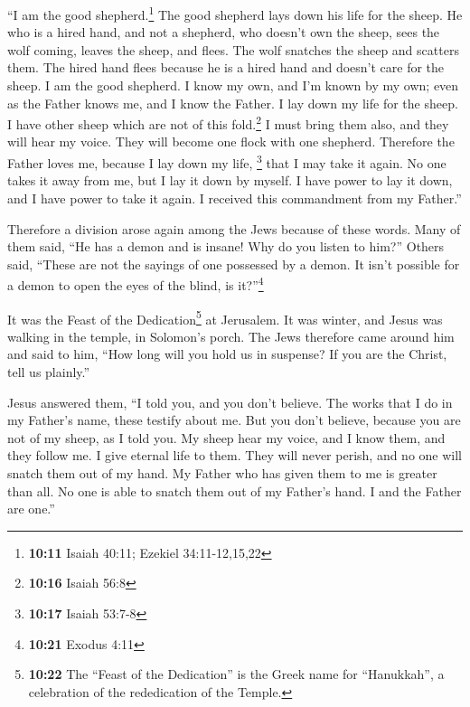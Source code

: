  ``I am the good shepherd.\footnote{\textbf{10:11} Isaiah
  40:11; Ezekiel 34:11-12,15,22} The good shepherd lays down his life
for the sheep.  He who is a hired hand, and not a
shepherd, who doesn't own the sheep, sees the wolf coming, leaves the
sheep, and flees. The wolf snatches the sheep and scatters them.
 The hired hand flees because he is a hired hand and
doesn't care for the sheep.  I am the good shepherd. I
know my own, and I'm known by my own;  even as the Father
knows me, and I know the Father. I lay down my life for the sheep.
 I have other sheep which are not of this
fold.\footnote{\textbf{10:16} Isaiah 56:8} I must bring them also, and
they will hear my voice. They will become one flock with one shepherd.
 Therefore the Father loves me, because I lay down my
life, \footnote{\textbf{10:17} Isaiah 53:7-8} that I may take it again.
 No one takes it away from me, but I lay it down by
myself. I have power to lay it down, and I have power to take it again.
I received this commandment from my Father.''

 Therefore a division arose again among the Jews because
of these words.  Many of them said, ``He has a demon and
is insane! Why do you listen to him?''  Others said,
``These are not the sayings of one possessed by a demon. It isn't
possible for a demon to open the eyes of the blind, is it?''\footnote{\textbf{10:21}
  Exodus 4:11}

 It was the Feast of the Dedication\footnote{\textbf{10:22}
  The ``Feast of the Dedication'' is the Greek name for ``Hanukkah'', a
  celebration of the rededication of the Temple.} at Jerusalem.
 It was winter, and Jesus was walking in the temple, in
Solomon's porch.  The Jews therefore came around him and
said to him, ``How long will you hold us in suspense? If you are the
Christ, tell us plainly.''

 Jesus answered them, ``I told you, and you don't
believe. The works that I do in my Father's name, these testify about
me.  But you don't believe, because you are not of my
sheep, as I told you.  My sheep hear my voice, and I know
them, and they follow me.  I give eternal life to them.
They will never perish, and no one will snatch them out of my hand.
 My Father who has given them to me is greater than all.
No one is able to snatch them out of my Father's hand.  I
and the Father are one.''

